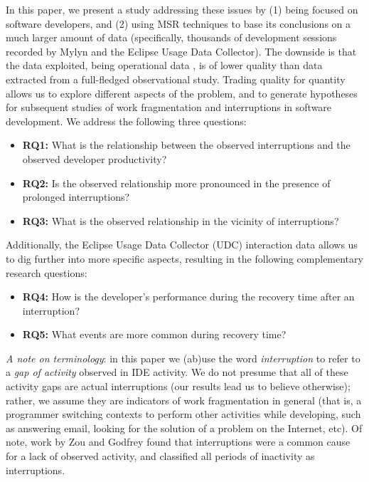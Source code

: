 \documentclass[times]{smrauth}
\begin{document}
In this paper, we present a study addressing these issues by (1) being focused on software developers, and (2) using MSR techniques to base its conclusions on a much larger amount of data (specifically, thousands of development sessions recorded by Mylyn and the Eclipse Usage Data Collector). The downside is that the data exploited, being operational data \cite{M14}, is of lower quality than data extracted from a full-fledged observational study. Trading quality for quantity allows us to explore different aspects of the problem, and to generate hypotheses for subsequent studies of work fragmentation and interruptions in software development. We address the following three questions:
\begin{itemize}
\item \textbf{RQ1:} What is the relationship between the observed interruptions and the observed developer productivity? 
\item \textbf{RQ2:} Is the observed relationship more pronounced in the presence of prolonged interruptions?
\item \textbf{RQ3:}  What is the observed relationship in the vicinity of interruptions?
\end{itemize}

Additionally, the Eclipse Usage Data Collector (UDC) interaction data allows us to dig further into more specific aspects, resulting in the following complementary research questions:
\begin{itemize}
\item \textbf{RQ4:} How is the developer's performance during the recovery time after an interruption? 
\item \textbf{RQ5:} What events are more common during recovery time?
\end{itemize}

\emph{A note on terminology}: in this paper we (ab)use the word \emph{interruption} to refer to a \emph{gap of activity} observed in IDE activity. We do not presume that all of these activity gaps are actual interruptions (our results lead us to believe otherwise); rather, we assume they are indicators of work fragmentation in general (that is, a programmer switching contexts to perform other activities while developing, such as answering email, looking for the solution of a problem on the Internet, etc). Of note, work by Zou and Godfrey \cite{ZG06} found that interruptions were a common cause for a lack of observed activity, and classified all periods of inactivity as interruptions. %
\end{document}
